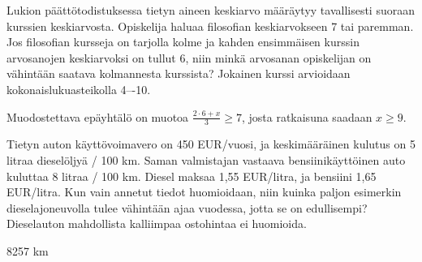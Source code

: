 \begin{tehtava}
Lukion päättötodistuksessa tietyn aineen keskiarvo määräytyy tavallisesti suoraan kurssien keskiarvosta. Opiskelija haluaa filosofian keskiarvokseen 7 tai paremman. Jos filosofian kursseja on tarjolla kolme ja kahden ensimmäisen kurssin arvosanojen keskiarvoksi on tullut 6, niin minkä arvosanan opiskelijan on vähintään saatava kolmannesta kurssista? Jokainen kurssi arvioidaan kokonaislukuasteikolla 4–-10.
\begin{vastaus}
Muodostettava epäyhtälö on muotoa $\frac{2\cdot 6+x}{3}\geq 7$, josta ratkaisuna saadaan $x\geq9$.
\end{vastaus}
\end{tehtava}

\begin{tehtava}
	Tietyn auton käyttövoimavero on 450 EUR/vuosi, ja keskimääräinen kulutus on 5 litraa dieselöljyä / 100 km. Saman valmistajan vastaava bensiinikäyttöinen auto kuluttaa 8 litraa / 100 km. Diesel maksaa 1,55 EUR/litra, ja bensiini 1,65 EUR/litra. Kun vain annetut tiedot huomioidaan, niin kuinka paljon esimerkin dieselajoneuvolla tulee vähintään ajaa vuodessa, jotta se on edullisempi? Dieselauton mahdollista kalliimpaa ostohintaa ei huomioida.
    \begin{vastaus}
        \item 8257 km
    \end{vastaus}
\end{tehtava}
